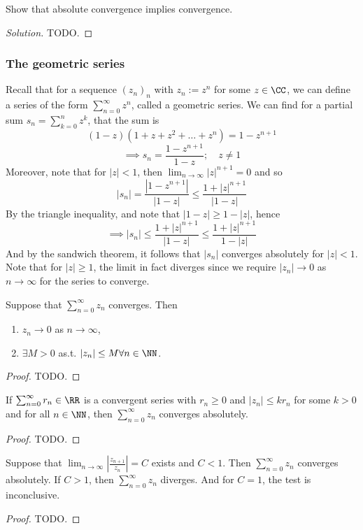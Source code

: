 \begin{exercise}
  Show that absolute convergence implies convergence.
\end{exercise}
\begin{proof}[Solution]
  TODO.
\end{proof}

\subsubsection{The geometric series}
Recall that for a sequence $(z_n)_n$ with $z_n:= z^n$ for some $z\in\CC$, we can
define a series of the form $\sum_{n=0}^{\infty}z^n$, called a geometric series.
We can find for a partial sum $s_n=\sum_{k=0}^{n}z^k$, that the sum is 
\[(1-z) (1+z+z^2+\dots +z^n) = 1-z^{n+1}\]
\[\implies s_n = \frac{1-z^{n+1}}{1-z}; \quad z\neq 1\]
Moreover, note that for $|z|<1$, then $\lim_{n\to\infty} |z|^{n+1} = 0$ and so 
\[|s_n| = \frac{|1-z^{n+1}|}{|1-z|} \leq \frac{1+|z|^{n+1}}{|1-z|}\]
By the triangle inequality, and note that $|1-z|\geq 1-|z|$, hence 
\[ \implies |s_n| \leq \frac{1+|z|^{n+1}}{|1-z|} \leq \frac{1+|z|^{n+1}}{1-|z|}\]
And by the sandwich theorem, it follows that $|s_n|$ converges absolutely for
$|z|<1$. Note that for $|z|\geq 1$, the limit in fact diverges since we require
$|z_n|\to 0$ as $n\to \infty$ for the series to converge.

\begin{corollary}
  Suppose that $\sum_{n=0}^{\infty} z_n$ converges. Then
  \begin{enumerate}
    \item $z_n\to 0$ as $n\to \infty$,
    \item $\exists M>0$ as.t. $|z_n|\leq M \forall n\in\NN$.
  \end{enumerate}
  \label{cor: convergentSeqBounded}
\end{corollary}
\begin{proof}
  TODO.
\end{proof}

\begin{corollary}
  If $\sum_{n=0}^{\infty} r_n\in\RR$ is a convergent series with $r_n\geq 0$ and
  $|z_n|\leq k r_n$ for some $k>0$ and for all $n\in\NN$, then
  $\sum_{n=0}^{\infty}z_n$ converges absolutely.
  \label{cor:comparisonTest}
\end{corollary}
\begin{proof}
  TODO.
\end{proof}

\begin{corollary}
  Suppose that $\lim_{n\to\infty}\left|\frac{z_{n+1}}{z_n}\right| = C$ exists
  and $C<1$. Then $\sum_{n=0}^{\infty}z_n$ converges absolutely. If $C>1$, then
  $\sum_{n=0}^{\infty}z_n$ diverges. And for $C=1$, the test is inconclusive.
  \label{cor:comparisonTest}
\end{corollary}
\begin{proof}
  TODO.
\end{proof}

